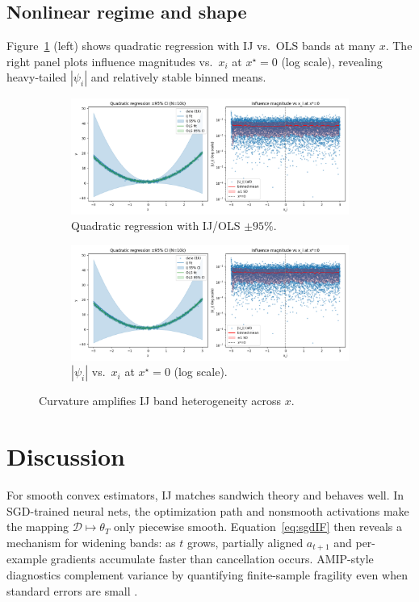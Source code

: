 \documentclass[11pt]{article}
\begin{document}
\subsection*{Nonlinear regime and shape}
Figure~\ref{fig:quad} (left) shows quadratic regression with IJ vs.\ OLS bands at many $x$. The right panel plots influence magnitudes vs.\ $x_i$ at $x^\star{=}0$ (log scale), revealing heavy-tailed $|\psi_i|$ and relatively stable binned means.

\begin{figure}[t]
  \centering
  \begin{subfigure}{0.56\linewidth}
    \includegraphics[width=\linewidth]{Figure_2.png}
    \caption{Quadratic regression with IJ/OLS $\pm95\%$.}
  \end{subfigure}\hfill
  \begin{subfigure}{0.40\linewidth}
    \includegraphics[width=\linewidth]{Figure_2.png}
    \caption{$|\psi_i|$ vs.\ $x_i$ at $x^\star{=}0$ (log scale).}
  \end{subfigure}
  \caption{Curvature amplifies IJ band heterogeneity across $x$.}
  \label{fig:quad}
\end{figure}

\section{Discussion}
For smooth convex estimators, IJ matches sandwich theory and behaves well. In SGD-trained neural nets, the optimization path and nonsmooth activations make the mapping $\mathcal{D}\mapsto \theta_T$ only piecewise smooth. Equation~\eqref{eq:sgdIF} then reveals a mechanism for widening bands: as $t$ grows, partially aligned $a_{t+1}$ and per-example gradients accumulate faster than cancellation occurs. AMIP-style diagnostics complement variance by quantifying finite-sample fragility even when standard errors are small \citep{broderick2023amip}.
\end{document}
